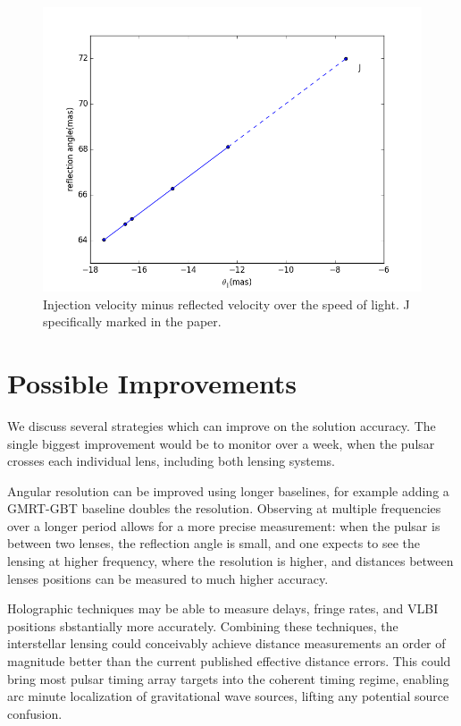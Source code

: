\documentclass{emulateapj}
\begin{document}
\begin{figure}
\centering
\includegraphics[width=1.0\textwidth,angle=0]{Reflection_angle.png}
\caption{Injection velocity minus reflected velocity over the speed of light. J specifically marked in the paper.}
\label{vtrans}
\end{figure}



\section{Possible Improvements}

We discuss several strategies which can improve on the solution
accuracy.  The single biggest improvement would be to monitor over a
week, when the pulsar crosses each individual lens, including both
lensing systems.

Angular resolution can be improved using longer baselines, for example
adding a GMRT-GBT baseline doubles the resolution.  Observing at
multiple frequencies over a longer period allows for a more precise
measurement: when the pulsar is between two lenses, the reflection
angle is small, and one expects to see the lensing at higher
frequency, where the resolution is higher, and distances between
lenses positions can be measured to much higher accuracy.

Holographic techniques\citep{2008MNRAS.388.1214W,2014MNRAS.440L..36P}
may be able to measure delays, fringe rates, and VLBI positions
sbstantially more accurately.  Combining these techniques, the
interstellar lensing could conceivably achieve distance measurements
an order of magnitude better than the current published effective
distance errors.  This could bring most pulsar timing array targets
into the coherent timing regime, enabling arc minute localization of
gravitational wave sources, lifting any potential source confusion.
\end{document}
